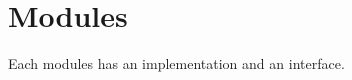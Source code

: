 \chapter{Modules}


Each modules has an implementation and an interface.

\begin{comment}
    implementation
        declarations

    declaration
        name: T
        name: T := def
\end{comment}
